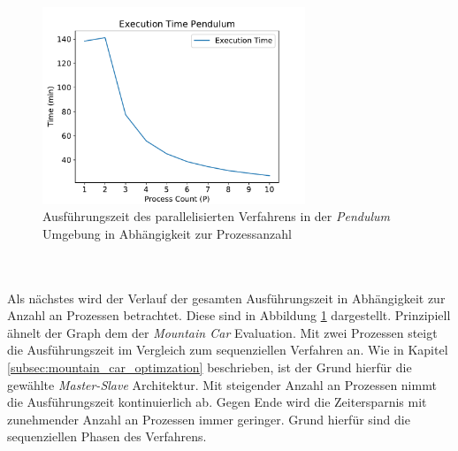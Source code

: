 \begin{figure}[!htb]
	\centering
	\includegraphics[width=0.7\textwidth]{./img/pendulum_analysis/pendulum_execution_1_1_10.pdf} 
	\caption{Ausführungszeit des parallelisierten Verfahrens in der \emph{Pendulum} Umgebung in Abhängigkeit zur Prozessanzahl}
	\label{fig:pendulum_execution_time_1_10}
\end{figure}
\\\\
Als nächstes wird der Verlauf der gesamten Ausführungszeit in Abhängigkeit zur Anzahl an Prozessen betrachtet. Diese sind in Abbildung \ref{fig:pendulum_execution_time_1_10} dargestellt. Prinzipiell ähnelt der Graph dem der \emph{Mountain Car} Evaluation. Mit zwei Prozessen steigt die Ausführungszeit im Vergleich zum sequenziellen Verfahren an. Wie in Kapitel \ref{subsec:mountain_car_optimzation} beschrieben, ist der Grund hierfür die gewählte \emph{Master-Slave} Architektur. Mit steigender Anzahl an Prozessen nimmt die Ausführungszeit kontinuierlich ab. Gegen Ende wird die Zeitersparnis mit zunehmender Anzahl an Prozessen immer geringer. Grund hierfür sind die sequenziellen Phasen des Verfahrens. 
